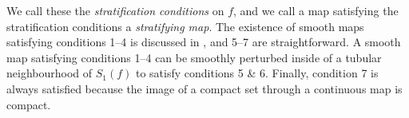 We call these the \emph{stratification conditions} on $f$, and we call a map satisfying the stratification conditions a \emph{stratifying map}.
The existence of smooth maps satisfying conditions 1--4 is discussed in \cite{Levine65}, and 5--7 are straightforward.
A smooth map satisfying conditions 1--4 can be smoothly perturbed inside of a tubular neighbourhood of $S_1(f)$ to satisfy conditions 5 \& 6.
Finally, condition 7 is always satisfied because the image of a compact set through a continuous map is compact.


